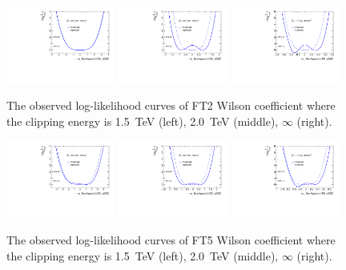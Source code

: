 \begin{figure}[ht]
    \centering
    \includegraphics[width=0.32\textwidth]{figures/aQGC/profileFT21500}
    	\includegraphics[width=0.32\textwidth]{figures/aQGC/profileFT22000}
        \includegraphics[width=0.32\textwidth]{figures/aQGC/profileFT2inf}
        \caption{The observed log-likelihood curves of FT2 Wilson coefficient where the clipping energy is 1.5~TeV (left), 2.0~TeV (middle), $\infty$ (right).}
        \label{fig:ProfileLL}
\end{figure}
\begin{figure}[ht]
    \centering
    \includegraphics[width=0.32\textwidth]{figures/aQGC/profileFT51500}
    	\includegraphics[width=0.32\textwidth]{figures/aQGC/profileFT52000}
        \includegraphics[width=0.32\textwidth]{figures/aQGC/profileFT5inf}
        \caption{The observed log-likelihood curves of FT5 Wilson coefficient where the clipping energy is 1.5~TeV (left), 2.0~TeV (middle), $\infty$ (right).}
        \label{fig:ProfileLL}
\end{figure}
